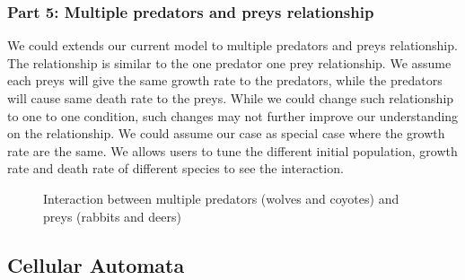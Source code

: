 \documentclass{article}
\begin{document}
\begin{normalsize}
	\subsubsection{Part 5: Multiple predators and preys relationship}
	We could extends our current model to multiple predators and preys relationship. The relationship is similar to the one predator one prey relationship. We assume each preys will give the same growth rate to the predators, while the predators will cause same death rate to the preys. While we could change such relationship to one to one condition, such changes may not further improve our understanding on the relationship. We could assume our case as special case where the growth rate are the same.
		We allows users to tune the different initial population, growth rate and death rate of different species to see the interaction. 
	\begin{figure}[H]
		\caption{Interaction between multiple predators (wolves and coyotes) and preys (rabbits and deers)}
	\end{figure}

\newpage
\subsection{Cellular Automata}

\end{normalsize}
\end{document}
